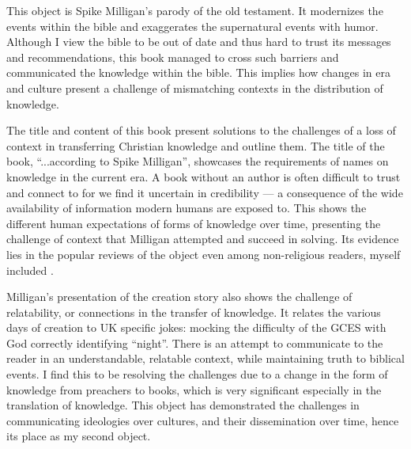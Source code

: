 \documentclass[a4paper,11pt]{article}
\begin{document}
This object is Spike Milligan's parody of the old testament. It modernizes the events within the bible and exaggerates the supernatural events with humor. Although I view the bible to be out of date and thus hard to trust its messages and recommendations, this book managed to cross such barriers and communicated the knowledge within the bible. This implies how changes in era and culture present a challenge of mismatching contexts in the distribution of knowledge.


The title and content of this book present solutions to the challenges of a loss of context in transferring Christian knowledge and outline them. The title of the book, ``...according to Spike Milligan'', showcases the requirements of names on knowledge in the current era. A book without an author is often difficult to trust and connect to for we find it uncertain in credibility --- a consequence of the wide availability of information modern humans are exposed to. This shows the different human expectations of forms of knowledge over time, presenting the challenge of context that Milligan attempted and succeed in solving. Its evidence lies in the popular reviews of the object even among non-religious readers, myself included \parencite{Review}.

Milligan's presentation of the creation story also shows the challenge of relatability, or connections in the transfer of knowledge. It relates the various days of creation to UK specific jokes: mocking the difficulty of the GCES with God correctly identifying ``night''. There is an attempt to communicate to the reader in an understandable, relatable context, while maintaining truth to biblical events. I find this to be resolving the challenges due to a change in the form of knowledge from preachers to books, which is very significant especially in the translation of knowledge. This object has demonstrated the challenges in communicating ideologies over cultures, and their dissemination over time, hence its place as my second object.
\end{document}
